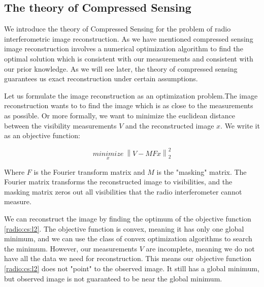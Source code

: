 
\subsection{The theory of Compressed Sensing}\label{radio:cs}
We introduce the theory of Compressed Sensing for the problem of radio interferometric image reconstruction. As we have mentioned compressed sensing image reconstruction involves a numerical optimization algorithm to find the optimal solution which is consistent with our measurements and consistent with our prior knowledge. As we will see later, the theory of compressed sensing guarantees us exact reconstruction under certain assumptions. 

Let us formulate the image reconstruction as an optimization problem.The image reconstruction wants to to find the image which is as close to the measurements as possible. Or more formally, we want to minimize the euclidean distance between the visibility measurements $V$ and the reconstructed image $x$. We write it as an objective function:

\begin{equation}\label{radio:cs:l2}
\underset{x}{minimize} \: \left \| V - MFx \right \|_2^2
\end{equation}

Where $F$ is the Fourier transform matrix and $M$ is the "masking" matrix. The Fourier matrix transforms the reconstructed image to visibilities, and the masking matrix zeros out all visibilities that the radio interferometer cannot measure.

We can reconstruct the image by finding the optimum of the objective function \eqref{radio:cs:l2}. The objective function is convex, meaning it has only one global minimum, and we can use the class of convex optimization algorithms to search the minimum. However, our measurements $V$ are incomplete, meaning we do not have all the data we need for reconstruction. This means our objective function \eqref{radio:cs:l2} does not "point" to the observed image. It still has a global minimum, but observed image is not guaranteed to be near the global minimum.

